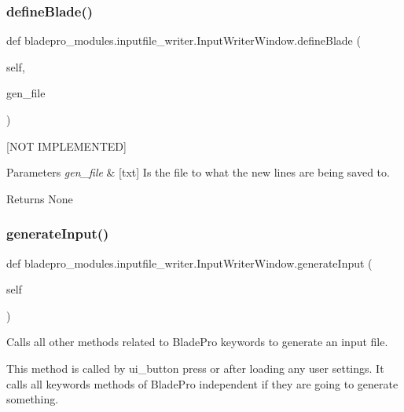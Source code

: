 \subsubsection{\texorpdfstring{define\+Blade()}{defineBlade()}}
{\footnotesize\ttfamily def bladepro\+\_\+modules.\+inputfile\+\_\+writer.\+Input\+Writer\+Window.\+define\+Blade (\begin{DoxyParamCaption}\item[{}]{self,  }\item[{}]{gen\+\_\+file }\end{DoxyParamCaption})}



\mbox{[}N\+OT I\+M\+P\+L\+E\+M\+E\+N\+T\+ED\mbox{]} 


\begin{DoxyParams}{Parameters}
{\em gen\+\_\+file} & \mbox{[}txt\mbox{]} Is the file to what the new lines are being saved to. \\
\hline
\end{DoxyParams}
\begin{DoxyReturn}{Returns}
None 
\end{DoxyReturn}
\hypertarget{a00070_a6ec74acbc44de3023188ddd8395b5b30}{}\label{a00070_a6ec74acbc44de3023188ddd8395b5b30} 
\subsubsection{\texorpdfstring{generate\+Input()}{generateInput()}}
{\footnotesize\ttfamily def bladepro\+\_\+modules.\+inputfile\+\_\+writer.\+Input\+Writer\+Window.\+generate\+Input (\begin{DoxyParamCaption}\item[{}]{self }\end{DoxyParamCaption})}



Calls all other methods related to Blade\+Pro keywords to generate an input file. 

This method is called by ui\+\_\+button press or after loading any user settings. It calls all keywords methods of Blade\+Pro independent if they are going to generate something.

